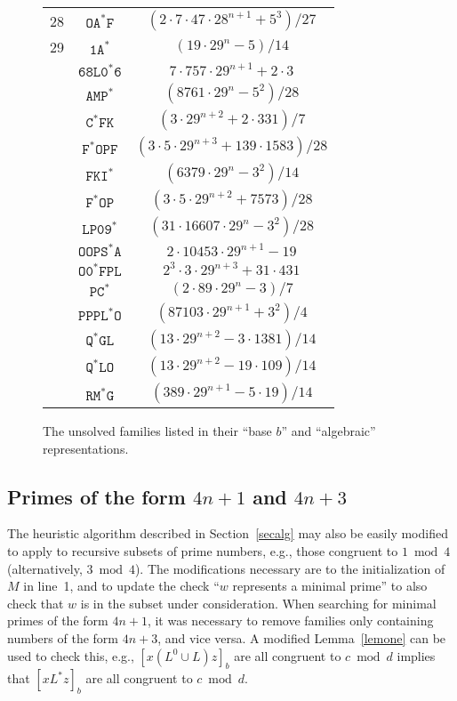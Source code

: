 \documentclass[12pt]{article}
\theoremstyle{plain}
\theoremstyle{definition}
\newcommand{\0}{\mathtt{0}}
\newcommand{\1}{\mathtt{1}}
\newcommand{\2}{\mathtt{2}}
\newcommand{\3}{\mathtt{3}}
\newcommand{\4}{\mathtt{4}}
\newcommand{\5}{\mathtt{5}}
\newcommand{\6}{\mathtt{6}}
\newcommand{\7}{\mathtt{7}}
\newcommand{\8}{\mathtt{8}}
\newcommand{\9}{\mathtt{9}}
\begin{document}
\begin{figure}
\begin{center}
\begin{tabular}{ccc}
28 & $\mathtt{OA^*F}$ & $(2\cdot7\cdot47\cdot28^{n+1}+5^3)/27$ \\
29 & $\mathtt{1A^*}$ & $(19\cdot29^n-5)/14$ \\
& $\mathtt{68L0^*6}$ & $7\cdot757\cdot29^{n+1}+2\cdot3$ \\
& $\mathtt{AMP^*}$ & $(8761\cdot29^n-5^2)/28$ \\
& $\mathtt{C^*FK}$ & $(3\cdot29^{n+2}+2\cdot331)/7$ \\
& $\mathtt{F^*OPF}$ & $(3\cdot5\cdot29^{n+3}+139\cdot1583)/28$ \\
& $\mathtt{FKI^*}$ & $(6379\cdot29^n-3^2)/14$ \\
& $\mathtt{F^*OP}$ & $(3\cdot5\cdot29^{n+2}+7573)/28$ \\
& $\mathtt{LP09^*}$ & $(31\cdot16607\cdot29^n-3^2)/28$ \\
& $\mathtt{OOPS^*A}$ & $2\cdot10453\cdot29^{n+1}-19$ \\
& $\mathtt{O0^*FPL}$ & $2^3\cdot3\cdot29^{n+3}+31\cdot431$ \\
& $\mathtt{PC^*}$ & $(2\cdot89\cdot29^n-3)/7$ \\
& $\mathtt{PPPL^*O}$ & $(87103\cdot29^{n+1}+3^2)/4$ \\
& $\mathtt{Q^*GL}$ & $(13\cdot29^{n+2}-3\cdot1381)/14$ \\
& $\mathtt{Q^*LO}$ & $(13\cdot29^{n+2}-19\cdot109)/14$ \\
& $\mathtt{RM^*G}$ & $(389\cdot29^{n+1}-5\cdot19)/14$
\end{tabular}\end{center}
\caption{The unsolved families listed in their ``base $b$'' and ``algebraic'' representations.}
\label{unsolved}
\end{figure}

\subsection{\boldmath Primes of the form $4n+1$ and $4n+3$}
The heuristic algorithm described in Section~\ref{secalg} may also be easily modified to apply to recursive subsets of prime numbers,
e.g., those congruent to $1\bmod4$ (alternatively, $3\bmod4$).  The modifications necessary are to the initialization
of $M$ in line~1, and to update the check ``$w$ represents a minimal prime'' to also check that $w$ is in the subset
under consideration.  When searching for minimal primes of the form $4n+1$, it was necessary to remove families only containing
numbers of the form $4n+3$, and vice versa.  A modified Lemma~\ref{lemone} can be used to check this, e.g.,
$[x(L^0\cup L)z]_b$ are all congruent to $c\bmod d$ implies that $[xL^*z]_b$ are all congruent to $c\bmod d$.
\end{document}
